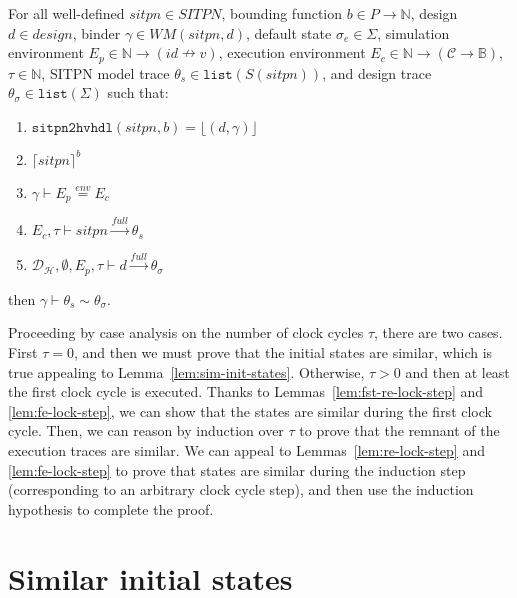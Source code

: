 \documentclass[dvipsnames,12pt]{article}
\begin{document}
\begin{thm}
  \label{thm:full-trace-sim}
  For all well-defined $sitpn\in{}SITPN$, bounding function
  $b\in{}P\rightarrow\mathbb{N}$, \hvhdl{} design $d\in{}design$,
  binder $\gamma\in{}WM(sitpn,d)$, default state $\sigma_e\in\Sigma$,
  simulation environment
  $E_p\in\mathbb{N}\rightarrow{}(id\nrightarrow{}v)$, execution
  environment
  $E_c\in\mathbb{N}\rightarrow(\mathcal{C}\rightarrow\mathbb{B})$,
  $\tau\in\mathbb{N}$, SITPN model trace
  $\theta_s\in\mathtt{list}(S(sitpn))$, and \hvhdl{} design trace
  $\theta_\sigma\in\mathtt{list}(\Sigma)$ such that:
  \begin{enumerate}
  \item $\mathtt{sitpn2hvhdl}(sitpn, b)=\lfloor(d,\gamma)\rfloor$
  \item $\lceil{}sitpn\rceil^b$
  \item $\gamma\vdash{}E_p\stackrel{env}{=}E_c$
  \item $E_c,\tau\vdash{}sitpn\xrightarrow{full}\theta_s$
  \item
    $\mathcal{D}_\mathcal{H},\emptyset,E_p,\tau\vdash{}d\xrightarrow{full}\theta_\sigma$
  \end{enumerate}
  then $\gamma\vdash\theta_s\sim\theta_\sigma$.
\end{thm}

\begin{niproof}
  
  Proceeding by case analysis on the number of clock cycles $\tau$,
  there are two cases. First $\tau=0$, and then we must prove that the
  initial states are similar, which is true appealing to
  Lemma~\ref{lem:sim-init-states}. Otherwise, $\tau>0$ and then at
  least the first clock cycle is executed. Thanks to
  Lemmas~\ref{lem:fst-re-lock-step} and \ref{lem:fe-lock-step}, we can
  show that the states are similar during the first clock cycle. Then,
  we can reason by induction over $\tau$ to prove that the remnant of
  the execution traces are similar. We can appeal to
  Lemmas~\ref{lem:re-lock-step} and \ref{lem:fe-lock-step} to prove
  that states are similar during the induction step (corresponding to
  an arbitrary clock cycle step), and then use the induction
  hypothesis to complete the proof.

\end{niproof}

\section{Similar initial states}
\label{sec:sim-init-states}
\end{document}
